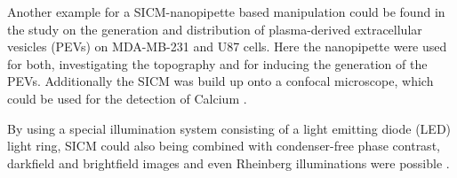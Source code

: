 Another example for a SICM-nanopipette based manipulation could be found in the study on the 
generation and distribution of plasma-derived extracellular vesicles (PEVs) on MDA-MB-231 and U87 
cells. Here the nanopipette were used for both, investigating the topography and for inducing the 
generation of the PEVs. Additionally the SICM was build up onto a confocal microscope, which could 
be used for the detection of Calcium \cite{Wang2020}.


By using a special illumination system consisting of a light emitting diode (LED) light ring, SICM 
could also being combined with condenser-free phase contrast, darkfield and brightfield images and 
even Rheinberg illuminations were possible \cite{Webb2014}.


